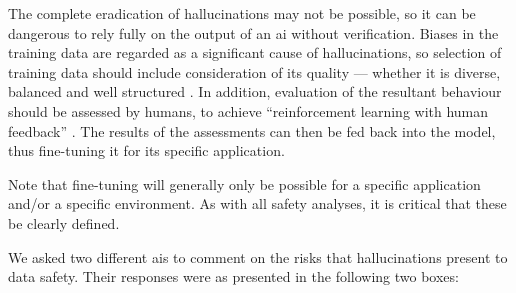 The complete eradication of hallucinations may not be possible, so it can be dangerous to rely fully
on the output of an \gls{ai} without verification. Biases in the training data are regarded as a
significant cause of hallucinations, so selection of training data should include consideration
of its quality --- whether it is diverse, balanced and well structured
\cite{citation:halucinations:website}. In addition, evaluation of the resultant behaviour should be
assessed by humans, to achieve ``reinforcement learning with human feedback''
\cite{citation:howchatgptworks:website}.
The results of the assessments can then be fed back into the model,
thus fine-tuning it for its specific application.

Note that fine-tuning will generally only be possible for a specific application and/or a specific
environment. As with all safety analyses, it is critical that these be clearly defined.

We asked two different \glspl{ai} to comment on the risks that hallucinations present to data safety. Their responses were as presented in the
following two boxes:

